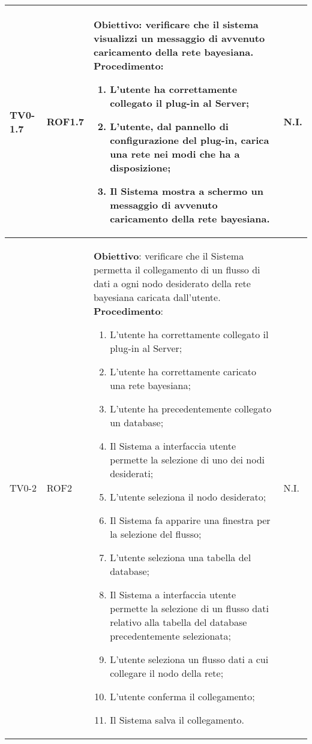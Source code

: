 \begin{longtable}{|C{.15\textwidth}|C{.13\textwidth}|m{.65\textwidth}|C{.08\textwidth}|}
TV0-1.7 & ROF1.7 &
	\textbf{Obiettivo}: verificare che il sistema visualizzi un messaggio di avvenuto caricamento della rete bayesiana. \newline
	\textbf{Procedimento}:
	\begin{enumerate}
		\item L'utente ha correttamente collegato il plug-in al Server;
		\item L'utente, dal pannello di configurazione del plug-in, carica una rete nei modi che ha a disposizione;
		\item Il Sistema mostra a schermo un messaggio di avvenuto caricamento della rete bayesiana.
	\end{enumerate} & N.I. \\
\hline

TV0-2 & ROF2 &
	\textbf{Obiettivo}: verificare che il Sistema permetta il collegamento di un flusso di dati a ogni nodo desiderato della rete bayesiana caricata dall'utente. \newline
	\textbf{Procedimento}:
	\begin{enumerate}
		\item L'utente ha correttamente collegato il plug-in al Server;
		\item L'utente ha correttamente caricato una rete bayesiana;
		\item L'utente ha precedentemente collegato un database;
		\item Il Sistema a interfaccia utente permette la selezione di uno dei nodi desiderati;
		\item L'utente seleziona il nodo desiderato;
		\item Il Sistema fa apparire una finestra per la selezione del flusso;
		\item L'utente seleziona una tabella del database;
		\item Il Sistema a interfaccia utente permette la selezione di un flusso dati relativo alla tabella del database precedentemente selezionata;
		\item L'utente seleziona un flusso dati a cui collegare il nodo della rete;
		\item L'utente conferma il collegamento;
		\item Il Sistema salva il collegamento.
	\end{enumerate}
	& N.I. \\
\hline


\end{longtable}

